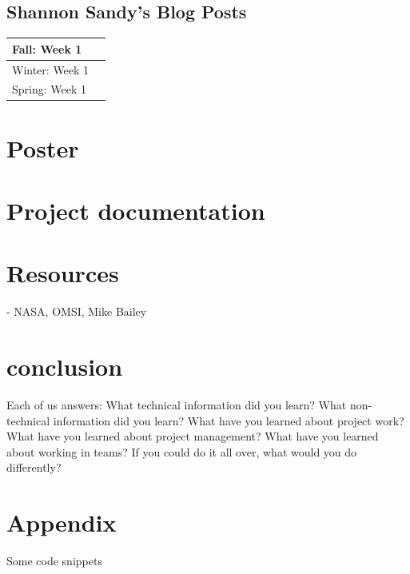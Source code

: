 \documentclass[onecolumn, draftclsnofoot,10pt, compsoc]{IEEEtran}
\begin{document}
\subsection* {Shannon Sandy's Blog Posts}
\begin{longtable} {|p{1.5cm}|p{13.5cm}|} \hline
Fall: Week 1 & \\ \hline
Winter: Week 1 & \\ \hline
Spring: Week 1 & \\ \hline
\end{longtable}

\section{Poster}






\section{Project documentation}



\section{Resources}
 - NASA, OMSI, Mike Bailey
 
 
 
\section{conclusion}

Each of us answers:
What technical information did you learn?
What non-technical information did you learn?
What have you learned about project work?
What have you learned about project management?
What have you learned about working in teams?
If you could do it all over, what would you do differently?

\section{Appendix}
Some code snippets
\end{document}
